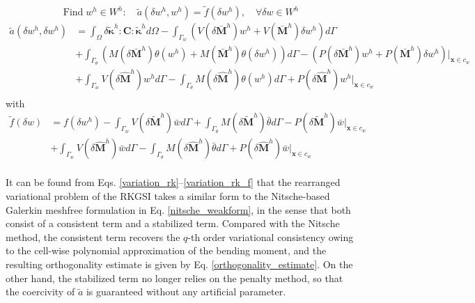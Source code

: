 \begin{equation}\label{variation_rk}
	\text{Find}\; w^h \in W^h:\quad\tilde a(\delta w^h, w^h) = \tilde f(\delta w^h) ,\quad \forall \delta w \in W^h
\end{equation}
\begin{equation}\label{variation_rk_a}
	\begin{aligned}
		\tilde a(\delta w^h,\delta w^h) &= \int_\Omega \delta\tilde{\boldsymbol\kappa}^h : \boldsymbol C : \tilde{\boldsymbol\kappa}^h d\Omega
		- \int_{\Gamma_{w}} \left( V(\delta\bar{\boldsymbol M}^h) w^h + V(\bar{\boldsymbol M}^h) \delta w^h \right) d\Gamma \\
		&+ \int_{\Gamma_{\theta}} \left( M(\delta\bar{\boldsymbol M}^h) \theta(w^h) + M(\bar{\boldsymbol M}^h) \theta(\delta w^h) \right) d\Gamma 
		- \left( P(\delta\bar{\boldsymbol M}^h) w^h + P(\bar{\boldsymbol M}^h) \delta w^h \right) \vert_{\boldsymbol x \in c_w} \\
		&+ \int_{\Gamma_{w}} V(\delta\hat{\boldsymbol M}^h) w^h d\Gamma 
		- \int_{\Gamma_{\theta}} M(\delta\hat{\boldsymbol M}^h) \theta(w^h) d\Gamma 
		+ P(\delta\hat{\boldsymbol M}^h) w^h \vert_{\boldsymbol x \in c_w} \\
	\end{aligned}
\end{equation}
with
\begin{equation}\label{variation_rk_f}
	\begin{aligned}
		\tilde f(\delta w) &= f(\delta w^h)  
		- \int_{\Gamma_{w}} V(\delta\tilde{\boldsymbol M}^h) \bar w d\Gamma 
		+ \int_{\Gamma_{\theta}} M(\delta\tilde{\boldsymbol M}^h) \bar \theta d\Gamma 
		- P(\delta\tilde{\boldsymbol M}^h) \bar w \vert_{\boldsymbol x \in c_w} \\
		&+ \int_{\Gamma_{w}} V(\delta\hat{\boldsymbol M}^h) \bar w d\Gamma 
		- \int_{\Gamma_{\theta}} M(\delta\hat{\boldsymbol M}^h) \bar \theta d\Gamma 
		+ P(\delta\hat{\boldsymbol M}^h) \bar w \vert_{\boldsymbol x \in c_w} \\
	\end{aligned}
\end{equation}

It can be found from Eqs. \eqref{variation_rk}--\eqref{variation_rk_f} that the rearranged variational problem of the RKGSI takes a similar form to the Nitsche-based Galerkin meshfree formulation \cite{} in Eq. \eqref{nitsche_weakform}, in the sense that both consist of a consistent term and a stabilized term.
Compared with the Nitsche method, the consistent term recovers the $q$-th order variational consistency owing to the cell-wise polynomial approximation of the bending moment, and the resulting orthogonality estimate is given by Eq. \eqref{orthogonality_estimate}.
On the other hand, the stabilized term no longer relies on the penalty method, so that the coercivity of $\tilde a$ is guaranteed without any artificial parameter.

